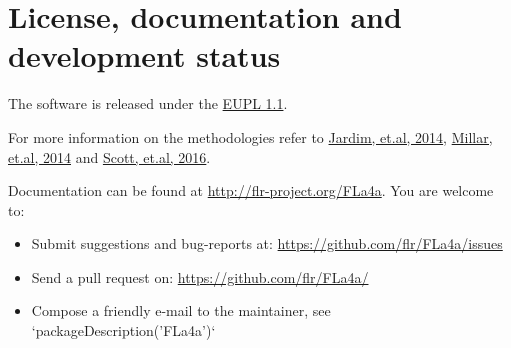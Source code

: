 \section{License, documentation and development status}

The software is released under the \href{https://joinup.ec.europa.eu/community/eupl/home}{EUPL 1.1}.

For more information on the \aFa methodologies refer to \href{http://icesjms.oxfordjournals.org/content/early/2014/04/03/icesjms.fsu050.abstract}{Jardim, et.al, 2014}, \href{http://icesjms.oxfordjournals.org/content/early/2014/03/31/icesjms.fsu043.abstract}{Millar, et.al, 2014} and \href{http://journals.plos.org/plosone/article?id=10.1371/journal.pone.0154922}{Scott, et.al, 2016}.

Documentation can be found at \url{http://flr-project.org/FLa4a}. You are welcome to:

\begin{itemize}
	\item Submit suggestions and bug-reports at: \url{https://github.com/flr/FLa4a/issues}
	\item Send a pull request on: \url{https://github.com/flr/FLa4a/}
	\item Compose a friendly e-mail to the maintainer, see `packageDescription('FLa4a')`
\end{itemize}


